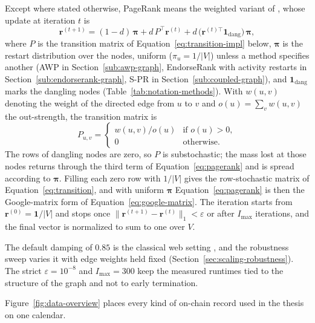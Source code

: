 Except where stated otherwise, PageRank means the weighted variant of \textcite{page1999pagerank}, whose update at iteration $t$ is
\begin{equation}
\label{eq:pagerank}
\mathbf{r}^{(t+1)}
=
(1-d)\,\boldsymbol{\pi}
+
d\,P^{\top}\mathbf{r}^{(t)}
+
d\,\bigl(\mathbf{r}^{(t)\top}\mathbf{1}_{\mathrm{dang}}\bigr)\,\boldsymbol{\pi},
\end{equation}
where $P$ is the transition matrix of Equation~\eqref{eq:transition-impl} below, $\boldsymbol{\pi}$ is the restart distribution over the nodes, uniform ($\pi_u=1/|V|$) unless a method specifies another (AWP in Section~\ref{sub:awp-graph}, EndorseRank with activity restarts in Section~\ref{sub:endorserank-graph}, \mbox{S-PR} in Section~\ref{sub:coupled-graph}), and $\mathbf{1}_{\mathrm{dang}}$ marks the dangling nodes (Table~\ref{tab:notation-methods}). With $w(u,v)$ denoting the weight of the directed edge from $u$ to $v$ and $o(u)=\sum_v w(u,v)$ the out-strength, the transition matrix is
\begin{equation}
\label{eq:transition-impl}
P_{u,v}
=
\begin{cases}
w(u,v)/o(u) & \text{if }o(u)>0,\\
0 & \text{otherwise.}
\end{cases}
\end{equation}
The rows of dangling nodes are zero, so $P$ is substochastic; the mass lost at those nodes returns through the third term of Equation~\eqref{eq:pagerank} and is spread according to $\boldsymbol{\pi}$. Filling each zero row with $1/|V|$ gives the row-stochastic matrix of Equation~\eqref{eq:transition}, and with uniform $\boldsymbol{\pi}$ Equation~\eqref{eq:pagerank} is then the Google-matrix form of Equation~\eqref{eq:google-matrix}. The iteration starts from $\mathbf{r}^{(0)}=\mathbf{1}/|V|$ and stops once $\|\mathbf{r}^{(t+1)}-\mathbf{r}^{(t)}\|_1 < \varepsilon$ or after $I_{\max}$ iterations, and the final vector is normalized to sum to one over $V$.

The default damping of $0.85$ is the classical web setting \parencite{page1999pagerank,langville2006pagerank}, and the robustness sweep varies it with edge weights held fixed (Section~\ref{sec:scaling-robustness}). The strict $\varepsilon=10^{-8}$ and $I_{\max}=300$ keep the measured runtimes tied to the structure of the graph and not to early termination.


Figure~\ref{fig:data-overview} places every kind of on-chain record used in the thesis on one calendar.

